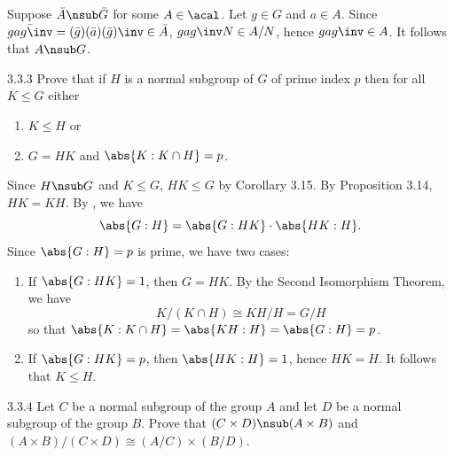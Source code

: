 \begin{sol}
\begin{enumerate}
        \leftimp Suppose $\bar A \nsub \bar G$ for some $A \in \acal$.
        Let $g \in G$ and $a \in A$.
        Since $\bar{gag\inv} = (\bar g)(\bar a)(\bar g)\inv \in \bar A$, $gag\inv N \in A/N$, hence $gag\inv \in A$.
        It follows that $A \nsub G$. \qedhere
    \end{enumerate}
\end{sol}

\begin{exercise}{3.3.3}
    Prove that if $H$ is a normal subgroup of $G$ of prime index $p$ then for all $K \leq G$ either
    \begin{enumerate}
        \item[(i)] $K \leq H$ or
        \item[(ii)] $G = HK$ and $\abs{K : K \cap H} = p$.
    \end{enumerate}
\end{exercise}

\begin{sol}
    Since $H \nsub G$ and $K \leq G$, $HK \leq G$ by Corollary 3.15.
	By Proposition 3.14, $HK = KH$.
	By , we have
    \[
    	\abs{G : H} = \abs{G : HK} \cdot \abs{HK : H}.
    \]
    Since $\abs{G : H} = p$ is prime, we have two cases:
    \begin{enumerate}
        \item If $\abs{G : HK} = 1$, then $G = HK$.
	    By the Second Isomorphism Theorem, we have
        \[
        	K/(K \cap H) \cong KH/H = G/H
        \]
        so that $\abs{K : K \cap H} = \abs{KH : H} = \abs{G : H} = p$.
        \item If $\abs{G : HK} = p$, then $\abs{HK : H} = 1$, hence $HK = H$.
	It follows that $K \leq H$. \qedhere
    \end{enumerate}
\end{sol}

\begin{exercise}{3.3.4}
    Let $C$ be a normal subgroup of the group $A$ and let $D$ be a normal subgroup of the group $B$.
	Prove that $(C \times D) \nsub (A \times B)$ and $(A \times B)/(C \times D) \cong (A/C) \times (B/D)$.
\end{exercise}

